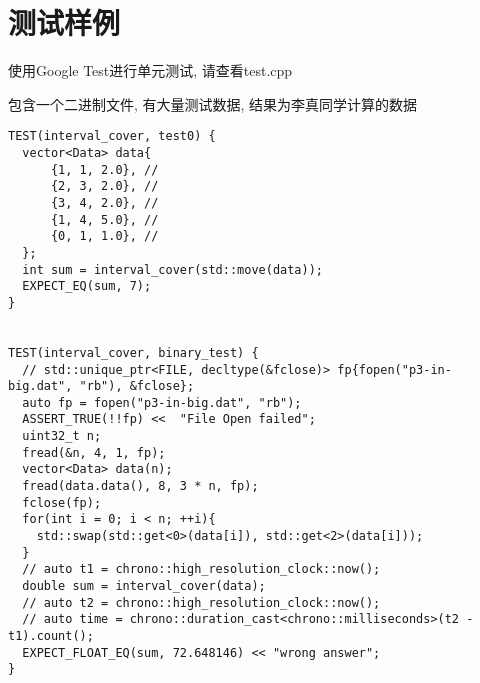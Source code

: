 \documentclass[a4paper]{article}
\begin{document}
\section{测试样例}
使用Google Test进行单元测试, 请查看test.cpp 

包含一个二进制文件, 有大量测试数据, 结果为李真同学计算的数据
\begin{verbatim}
TEST(interval_cover, test0) {
  vector<Data> data{
      {1, 1, 2.0}, //
      {2, 3, 2.0}, //
      {3, 4, 2.0}, //
      {1, 4, 5.0}, //
      {0, 1, 1.0}, //
  };
  int sum = interval_cover(std::move(data));
  EXPECT_EQ(sum, 7);
}


TEST(interval_cover, binary_test) {
  // std::unique_ptr<FILE, decltype(&fclose)> fp{fopen("p3-in-big.dat", "rb"), &fclose};
  auto fp = fopen("p3-in-big.dat", "rb");
  ASSERT_TRUE(!!fp) <<  "File Open failed";
  uint32_t n;
  fread(&n, 4, 1, fp);
  vector<Data> data(n);
  fread(data.data(), 8, 3 * n, fp);
  fclose(fp);
  for(int i = 0; i < n; ++i){
    std::swap(std::get<0>(data[i]), std::get<2>(data[i]));
  }
  // auto t1 = chrono::high_resolution_clock::now();
  double sum = interval_cover(data);
  // auto t2 = chrono::high_resolution_clock::now();
  // auto time = chrono::duration_cast<chrono::milliseconds>(t2 - t1).count();
  EXPECT_FLOAT_EQ(sum, 72.648146) << "wrong answer";
}
\end{verbatim}
\end{document}
